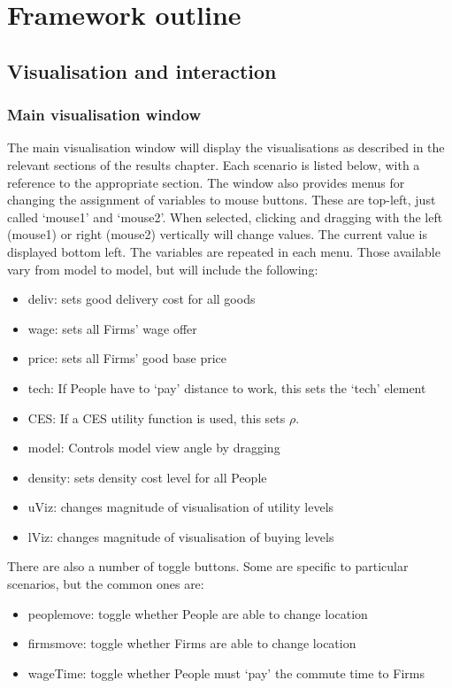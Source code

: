 \section{Framework outline \label{sec:modelsCD}}
\subsection{Visualisation and interaction}

\subsubsection{Main visualisation window}

The main visualisation window will display the visualisations as described in the relevant sections of the results chapter. Each scenario is listed below, with a reference to the appropriate section. The window also provides menus for changing the assignment of variables to mouse buttons. These are top-left, just called `mouse1' and `mouse2'. When selected, clicking and dragging with the left (mouse1) or right (mouse2) vertically will change values. The current value is displayed bottom left. The variables are repeated in each menu. Those available vary from model to model, but will include the following:

\begin{itemize}
	\item deliv: sets good delivery cost for all goods
	\item wage: sets all Firms' wage offer
	\item price: sets all Firms' good base price
	\item tech: If People have to `pay' distance to work, this sets the `tech' element
	\item CES: If a CES utility function is used, this sets $\rho$.
	\item model: Controls model view angle by dragging
	\item density: sets density cost level for all People
	\item uViz: changes magnitude of visualisation of utility levels
	\item lViz: changes magnitude of visualisation of buying levels
\end{itemize}

There are also a number of toggle buttons. Some are specific to particular scenarios, but the common ones are:

\begin{itemize}
	\item peoplemove: toggle whether People are able to change location
	\item firmsmove: toggle whether Firms are able to change location
	\item wageTime: toggle whether People must `pay' the commute time to Firms
\end{itemize}

